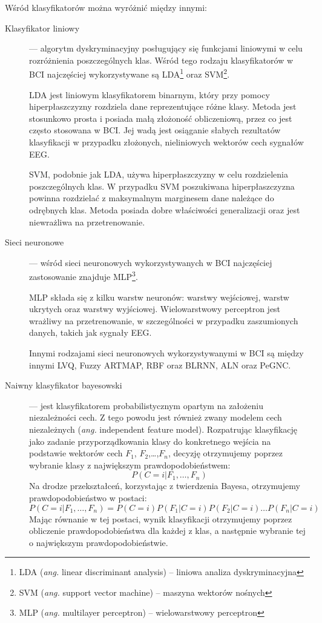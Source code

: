 \documentclass[skorowidz,skroty]{dyplomWEZUT}
\begin{document}
Wśród klasyfikatorów można wyróżnić między innymi:
\begin{description}
    \item [Klasyfikator liniowy] --- algorytm dyskryminacyjny posługujący się funkcjami liniowymi w celu rozróżnienia poszczególnych klas\cite{eeg_classification}. Wśród tego rodzaju klasyfikatorów w BCI najczęściej wykorzystywane są LDA\footnote{LDA (\textit{ang.} linear discriminant analysis) -- liniowa analiza dyskryminacyjna} oraz SVM\footnote{SVM (\textit{ang.} support vector machine) -- maszyna wektorów nośnych}\cite{bci_trends}.
    
    LDA jest liniowym klasyfikatorem binarnym, który przy pomocy hiperpłaszczyzny rozdziela dane reprezentujące różne klasy\cite{eeg_classification}. Metoda jest stosunkowo prosta i posiada małą złożoność obliczeniową, przez co jest często stosowana w BCI. Jej wadą jest osiąganie słabych rezultatów klasyfikacji w przypadku złożonych, nieliniowych wektorów cech sygnałów EEG\cite{bci_trends}. 

    SVM, podobnie jak LDA, używa hiperpłaszczyzny w celu rozdzielenia poszczególnych klas. W przypadku SVM poszukiwana hiperpłaszczyzna powinna rozdzielać z maksymalnym marginesem dane należące do odrębnych klas. Metoda posiada dobre właściwości generalizacji oraz jest niewrażliwa na przetrenowanie\cite{eeg_features}.

    \item [Sieci neuronowe] --- wśród sieci neuronowych wykorzystywanych w BCI najczęściej zastosowanie znajduje MLP\footnote{MLP (\textit{ang.} multilayer perceptron) -- wielowarstwowy perceptron}\cite{eeg_classification}.
    
    MLP składa się z kilku warstw neuronów: warstwy wejściowej, warstw ukrytych oraz warstwy wyjściowej. Wielowarstwowy perceptron jest wrażliwy na przetrenowanie, w szczególności w przypadku zaszumionych danych, takich jak sygnały EEG\cite{bci_trends}.

    Innymi rodzajami sieci neuronowych wykorzystywanymi w BCI są między innymi LVQ, Fuzzy ARTMAP, RBF oraz BLRNN, ALN oraz PeGNC\cite{eeg_classification}.
    
    \item [Naiwny klasyfikator bayesowski] --- jest klasyfikatorem probabilistycznym opartym na założeniu niezależności cech. Z tego powodu jest również zwany modelem cech niezależnych (\textit{ang.} independent feature model). Rozpatrując klasyfikację jako zadanie przyporządkowania klasy do konkretnego wejścia na podstawie wektorów cech $F_1$, $F_2$,\dots,$F_n$, decyzję otrzymujemy poprzez wybranie klasy z największym prawdopodobieństwem:
    $$P(C=i|F_1, \dots ,F_n)$$
    Na drodze przekształceń, korzystając z twierdzenia Bayesa, otrzymujemy prawdopodobieństwo w postaci:
    $$P(C=i|F_1, \dots ,F_n) = P(C=i)P(F_1|C=i)P(F_2|C=i) \dots P(F_n|C=i)$$
    Mając równanie w tej postaci, wynik klasyfikacji otrzymujemy poprzez obliczenie prawdopodobieństwa dla każdej z klas, a następnie wybranie tej o największym prawdopodobieństwie\cite{bci_introduction}.    


\end{description}
\end{document}
